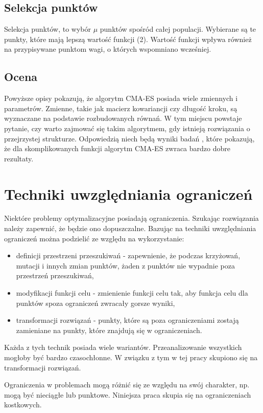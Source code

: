 \documentclass{mini}
\begin{document}
\subsection{Selekcja punktów} \label{selekcjapunktow}
Selekcja punktów, to wybór $\mu$ punktów spośród całej populacji. Wybierane są te punkty, które mają lepszą wartość funkcji (2). Wartość funkcji wpływa również na przypisywane punktom wagi, o których wspomniano wcześniej.

\subsection{Ocena}
Powyższe opisy pokazują, że algorytm CMA-ES posiada wiele zmiennych i parametrów. Zmienne, takie jak macierz kowariancji czy długość kroku, są wyznaczane na podstawie rozbudowanych równań. W tym miejscu powstaje pytanie, czy warto zajmować się takim algorytmem, gdy istnieją rozwiązania o przejrzystej strukturze. Odpowiedzią niech będą wyniki badań \cite{bbob}, które pokazują, że dla skomplikowanych funkcji algorytm CMA-ES zwraca bardzo dobre rezultaty.

\pagebreak

\section{Techniki uwzględniania ograniczeń} \label{technikiogr}
Niektóre problemy optymalizacyjne posiadają ograniczenia. Szukając rozwiązania należy zapewnić, że będzie ono dopuszczalne. Bazując na \cite{wyklady} techniki uwzględniania ograniczeń można podzielić ze względu na wykorzystanie:
\begin{itemize}[noitemsep]
\item definicji przestrzeni przeszukiwań - zapewnienie, że podczas krzyżowań, mutacji i innych zmian punktów, żaden z punktów nie wypadnie poza przestrzeń przeszukiwań,
\item modyfikacji funkcji celu - zmienienie funkcji celu tak, aby funkcja celu dla punktów spoza ograniczeń zwracały gorsze wyniki,
\item transformacji rozwiązań - punkty, które są poza ograniczeniami zostają zamieniane na punkty, które znajdują się w ograniczeniach.
\end{itemize}

Każda z tych technik posiada wiele wariantów. Przeanalizowanie wszystkich mogłoby być bardzo czasochłonne. W związku z tym w tej pracy skupiono się na transformacji rozwiązań.

Ograniczenia w problemach mogą różnić się ze względu na swój charakter, np. mogą być nieciągłe lub punktowe. Niniejsza praca skupia się na ograniczeniach kostkowych.
\end{document}
